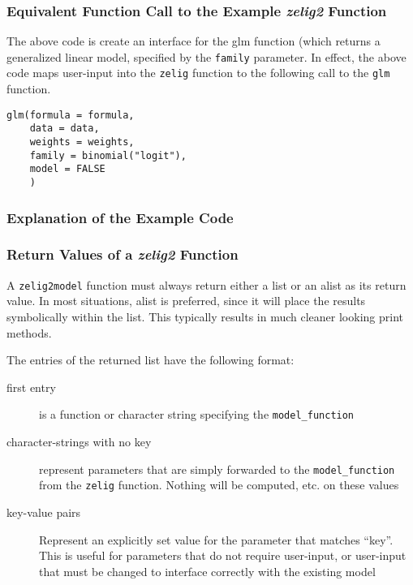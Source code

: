 
\subsubsection{Equivalent Function Call to the Example \emph{zelig2} Function}
The above code is create an interface for the glm function (which returns a generalized linear model, specified by the {\tt family} parameter.  In effect, the above code maps user-input into the {\tt zelig} function to the following call to the {\tt glm} function.

\begin{verbatim}
glm(formula = formula,
    data = data,
    weights = weights,
    family = binomial("logit"),
    model = FALSE
    )
\end{verbatim}

\subsubsection{Explanation of the Example Code}

\subsubsection{Return Values of a \emph{zelig2} Function}

A {\tt zelig2model} function must always return either a list or an alist as its return value.  In most situations, alist is preferred, since it will place the results symbolically within the list.  This typically results in much cleaner looking print methods.

The entries of the returned list have the following format:
\begin{description}
	\item[first entry]{is a function or character string specifying the {\tt model\_function}}
	\item[character-strings with no key]{represent parameters that are simply forwarded to the {\tt model\_function} from the {\tt zelig} function.  Nothing will be computed, etc. on these values}
	\item[key-value pairs]{Represent an explicitly set value for the parameter that matches ``key''.  This is useful for parameters that do not require user-input, or user-input that must be changed to interface correctly with the existing model}
\end{description}


